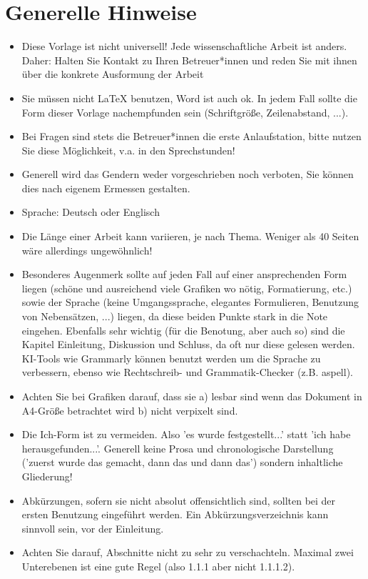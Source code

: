 \section {Generelle Hinweise}
\begin{itemize}
    \item Diese Vorlage ist nicht universell! Jede wissenschaftliche Arbeit ist anders. Daher: Halten Sie Kontakt zu Ihren Betreuer*innen und reden Sie mit ihnen über die konkrete Ausformung der Arbeit
    \item Sie müssen nicht LaTeX benutzen, Word ist auch ok. In jedem Fall sollte die Form dieser Vorlage nachempfunden sein (Schriftgröße, Zeilenabstand, ...).
    \item Bei Fragen sind stets die Betreuer*innen die erste Anlaufstation, bitte nutzen Sie diese Möglichkeit, v.a. in den Sprechstunden!
    \item Generell wird das Gendern weder vorgeschrieben noch verboten, Sie können dies nach eigenem Ermessen gestalten. 
    \item Sprache: Deutsch oder Englisch
     \item Die Länge einer Arbeit kann variieren, je nach Thema. Weniger als 40 Seiten wäre allerdings ungewöhnlich!
     \item Besonderes Augenmerk sollte auf jeden Fall auf einer ansprechenden Form liegen (schöne und ausreichend viele Grafiken wo nötig, Formatierung, etc.) sowie der Sprache (keine Umgangssprache, elegantes Formulieren, Benutzung von Nebensätzen, ...) liegen, da diese beiden Punkte stark in die Note eingehen. Ebenfalls sehr wichtig (für die Benotung, aber auch so) sind die Kapitel Einleitung, Diskussion und Schluss, da oft nur diese gelesen werden. KI-Tools wie Grammarly können benutzt werden um die Sprache zu verbessern, ebenso wie Rechtschreib- und Grammatik-Checker (z.B. aspell). 
     \item Achten Sie bei Grafiken darauf, dass sie a) lesbar sind wenn das Dokument in A4-Größe betrachtet wird b) nicht verpixelt sind.
     \item Die Ich-Form ist zu vermeiden. Also 'es wurde festgestellt...' statt 'ich habe herausgefunden...'. Generell keine Prosa und chronologische Darstellung ('zuerst wurde das gemacht, dann das und dann das') sondern inhaltliche Gliederung!
     \item Abkürzungen, sofern sie nicht absolut offensichtlich sind, sollten bei der ersten Benutzung eingeführt werden. Ein Abkürzungsverzeichnis kann sinnvoll sein, vor der Einleitung.
     \item Achten Sie darauf, Abschnitte nicht zu sehr zu verschachteln. Maximal zwei Unterebenen ist eine gute Regel (also 1.1.1 aber nicht 1.1.1.2). 
\end{itemize}

